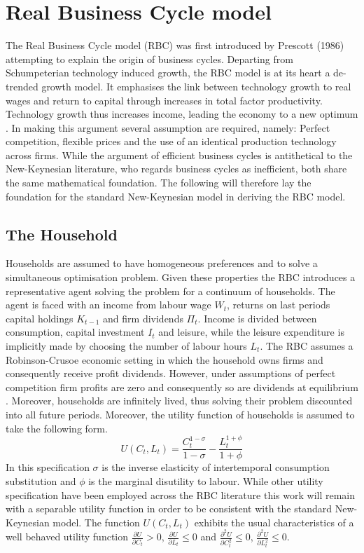 \documentclass[12pt,a4paper,english]{article} %
\let\oldsection\section
\renewcommand\section{\clearpage\oldsection}
\begin{document}
	\section{Real Business Cycle model}
	The Real Business Cycle model (RBC) was first introduced by Prescott (1986) \cite{prescott_theory_1986} attempting to explain the origin of business cycles. Departing from Schumpeterian technology induced growth, the RBC model is at its heart a de-trended growth model. It emphasises the link between technology growth to real wages and return to capital through increases in total factor productivity. Technology growth thus increases income, leading the economy to a new optimum \cite{prescott_theory_1986}. 
	In making this argument several assumption are required, namely: Perfect competition, flexible prices and the use of an identical production technology across firms. While the argument of efficient business cycles is antithetical to the New-Keynesian literature, who regards business cycles as inefficient, both share the same mathematical foundation. The following will therefore lay the foundation for the standard New-Keynesian model in deriving the RBC model.
	
	\subsection{The Household}
	Households are assumed to have homogeneous preferences and to solve a simultaneous optimisation problem. Given these properties the RBC introduces a representative agent solving the problem for a continuum of households.
	The agent is faced with an income from labour wage $W_t$, returns on last periods capital holdings $K_{t-1}$ and firm dividends $\Pi_t$. Income is divided between consumption, capital investment $I_t$ and leisure, while the leisure expenditure is implicitly made by choosing the number of labour hours $L_t$. The RBC assumes a Robinson-Crusoe economic setting in which the household owns firms and consequently receive profit dividends. However, under assumptions of perfect competition firm profits are zero and consequently so are dividends at equilibrium \cite{prescott_theory_1986}. 
	Moreover, households are infinitely lived, thus solving their problem discounted into all future periods. Moreover, the utility function of households is assumed to take the following form.
	\begin{equation}
		U(C_t, L_t) = \frac{C_t^{1-\sigma}}{{1-\sigma}} - \frac{L_t^{1+\phi}}{1+\phi} 
	\end{equation}
	In this specification $\sigma$ is the inverse elasticity of intertemporal consumption substitution and $\phi$ is the marginal disutility to labour. While other utility specification have been employed across the RBC literature this work will remain with a separable utility function in order to be consistent with the standard New-Keynesian model. The function $U(C_t, L_t)$ exhibits the usual characteristics of a well behaved utility function $\frac{\partial U}{\partial C_t} > 0$, $\frac{\partial U}{\partial L_t} \leq 0$ and $\frac{\partial^2 U}{\partial C_t^2} \leq 0$, $\frac{\partial^2 U}{\partial L_t^2} \leq 0$.
	
\end{document}
